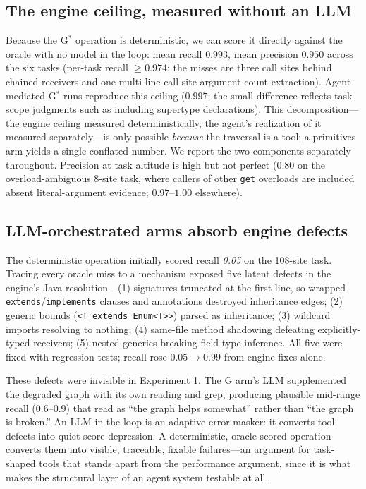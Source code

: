 \documentclass[11pt]{article}
\newcommand{\code}[1]{\texttt{#1}}
\newcommand{\gstar}{G$^{*}$}
\begin{document}
\subsection{The engine ceiling, measured without an LLM}
\label{sec:ceiling}
Because the \gstar{} operation is deterministic, we can score it directly against
the oracle with no model in the loop: mean recall $0.993$, mean precision
$0.950$ across the six tasks (per-task recall $\ge 0.974$; the misses are three
call sites behind chained receivers and one multi-line call-site argument-count
extraction). Agent-mediated \gstar{} runs reproduce this ceiling ($0.997$; the
small difference reflects task-scope judgments such as including supertype
declarations). This decomposition---the engine ceiling measured
deterministically, the agent's realization of it measured separately---is only
possible \emph{because} the traversal is a tool; a primitives arm yields a
single conflated number. We report the two components separately throughout. Precision at task altitude is high but not
perfect ($0.80$ on the overload-ambiguous 8-site task, where callers of other
\code{get} overloads are included absent literal-argument evidence;
$0.97$--$1.00$ elsewhere).

\subsection{LLM-orchestrated arms absorb engine defects}
\label{sec:bugs}
The deterministic operation initially scored recall \emph{0.05} on the 108-site
task. Tracing every oracle miss to a mechanism exposed five latent defects in the
engine's Java resolution---(1) signatures truncated at the first line, so
wrapped \code{extends}/\code{implements} clauses and annotations destroyed
inheritance edges; (2) generic bounds (\code{<T extends Enum<T>{}>}) parsed as
inheritance; (3) wildcard imports resolving to nothing; (4) same-file method
shadowing defeating explicitly-typed receivers; (5) nested generics breaking
field-type inference. All five were fixed with regression tests; recall rose
$0.05 \to 0.99$ from engine fixes alone.

These defects were invisible in Experiment 1. The G arm's LLM supplemented
the degraded graph with its own reading and grep, producing plausible mid-range
recall (0.6--0.9) that read as ``the graph helps somewhat'' rather than ``the
graph is broken.'' An LLM in the loop is an adaptive error-masker: it converts
tool defects into quiet score depression. A deterministic, oracle-scored
operation converts them into visible, traceable, fixable failures---an argument
for task-shaped tools that stands apart from the performance argument, since it
is what makes the structural layer of an agent system testable at all.
\end{document}

